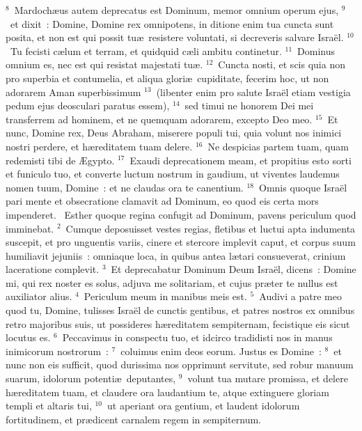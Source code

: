 ${}^{8}$~Mardoch\ae us autem deprecatus est Dominum, memor omnium operum ejus,
${}^{9}$~et dixit~: Domine, Domine rex omnipotens, in ditione enim tua cuncta sunt posita, et non est qui possit tu\ae\ resistere voluntati, si decreveris salvare Isra\"el.
${}^{10}$~Tu fecisti c\ae lum et terram, et quidquid c\ae li ambitu continetur.
${}^{11}$~Dominus omnium es, nec est qui resistat majestati tu\ae .
${}^{12}$~Cuncta nosti, et scis quia non pro superbia et contumelia, et aliqua glori\ae\ cupiditate, fecerim hoc, ut non adorarem Aman superbissimum
${}^{13}$~(libenter enim pro salute Isra\"el etiam vestigia pedum ejus deosculari paratus essem),
${}^{14}$~sed timui ne honorem Dei mei transferrem ad hominem, et ne quemquam adorarem, excepto Deo meo.
${}^{15}$~Et nunc, Domine rex, Deus Abraham, miserere populi tui, quia volunt nos inimici nostri perdere, et h\ae reditatem tuam delere.
${}^{16}$~Ne despicias partem tuam, quam redemisti tibi de \AE gypto.
${}^{17}$~Exaudi deprecationem meam, et propitius esto sorti et funiculo tuo, et converte luctum nostrum in gaudium, ut viventes laudemus nomen tuum, Domine~: et ne claudas ora te canentium.
${}^{18}$~Omnis quoque Isra\"el pari mente et obsecratione clamavit ad Dominum, eo quod eis certa mors impenderet.
~\lettrine[lines=10,image=true,loversize=0.05,lraise=-0.03]{E}{}sther quoque regina confugit ad Dominum, pavens periculum quod imminebat.
${}^{2}$~Cumque deposuisset vestes regias, fletibus et luctui apta indumenta suscepit, et pro unguentis variis, cinere et stercore implevit caput, et corpus suum humiliavit jejuniis~: omniaque loca, in quibus antea l\ae tari consueverat, crinium laceratione complevit.
${}^{3}$~Et deprecabatur Dominum Deum Isra\"el, dicens~: Domine mi, qui rex noster es solus, adjuva me solitariam, et cujus pr\ae ter te nullus est auxiliator alius.
${}^{4}$~Periculum meum in manibus meis est.
${}^{5}$~Audivi a patre meo quod tu, Domine, tulisses Isra\"el de cunctis gentibus, et patres nostros ex omnibus retro majoribus suis, ut possideres h\ae reditatem sempiternam, fecistique eis sicut locutus es.
${}^{6}$~Peccavimus in conspectu tuo, et idcirco tradidisti nos in manus inimicorum nostrorum~:
${}^{7}$~coluimus enim deos eorum. Justus es Domine~:
${}^{8}$~et nunc non eis sufficit, quod durissima nos opprimunt servitute, sed robur manuum suarum, idolorum potenti\ae\ deputantes,
${}^{9}$~volunt tua mutare promissa, et delere h\ae reditatem tuam, et claudere ora laudantium te, atque extinguere gloriam templi et altaris tui,
${}^{10}$~ut aperiant ora gentium, et laudent idolorum fortitudinem, et pr\ae dicent carnalem regem in sempiternum.
